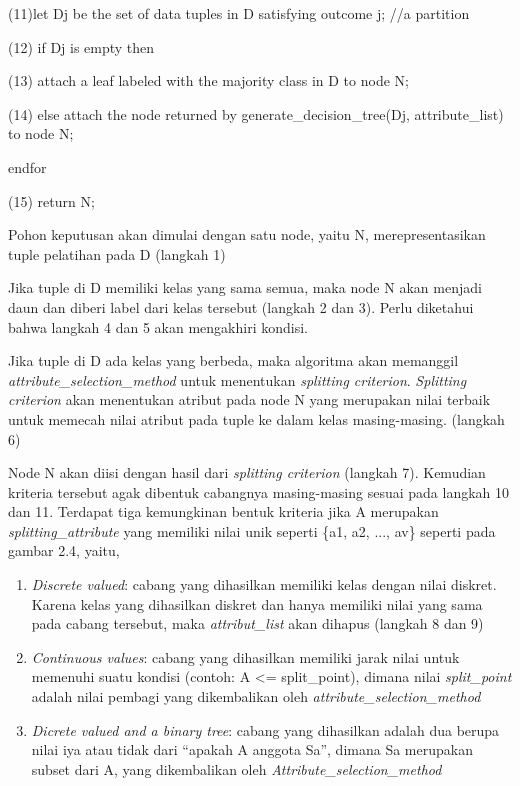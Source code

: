 (11)let D\lowercase{j} be the set of data tuples in D satisfying outcome j; //a partition

(12) if D\lowercase{j} is empty then

(13) attach a leaf labeled with the majority class in D to node N;

(14) else attach the node returned by generate\_decision\_tree(D\lowercase{j}, attribute\_list) to node N;

endfor

(15) return N;


Pohon keputusan akan dimulai dengan satu node, yaitu N, merepresentasikan tuple pelatihan pada D (langkah 1)

Jika tuple di D memiliki kelas yang sama semua, maka node N akan menjadi daun dan diberi label dari kelas tersebut (langkah 2 dan 3). Perlu diketahui bahwa langkah 4 dan 5 akan mengakhiri kondisi.

Jika tuple di D ada kelas yang berbeda, maka algoritma akan memanggil \textsl{attribute\_selection\_method} untuk menentukan \textsl{splitting criterion}. \textsl{Splitting criterion} akan menentukan atribut pada node N yang merupakan nilai terbaik untuk memecah nilai atribut pada tuple ke dalam kelas masing-masing. (langkah 6)

Node N akan diisi dengan hasil dari \textsl{splitting criterion} (langkah 7). Kemudian kriteria tersebut agak dibentuk cabangnya masing-masing sesuai pada langkah 10 dan 11. Terdapat tiga kemungkinan bentuk kriteria jika A merupakan \textsl{splitting\_attribute} yang memiliki nilai unik seperti \{a1, a2, ..., av\} seperti pada gambar 2.4, yaitu,

\begin{enumerate}
	\item \textsl{Discrete valued}: cabang yang dihasilkan memiliki kelas dengan nilai diskret. Karena kelas yang dihasilkan diskret dan hanya memiliki nilai yang sama pada cabang tersebut, maka \textsl{attribut\_list} akan dihapus (langkah 8 dan 9)
	\item \textsl{Continuous values}: cabang yang dihasilkan memiliki jarak nilai untuk memenuhi suatu kondisi (contoh: A <= split\_point), dimana nilai \textsl{split\_point} adalah nilai pembagi yang dikembalikan oleh \textsl{attribute\_selection\_method}
	\item \textsl{Dicrete valued and a binary tree}: cabang yang dihasilkan adalah dua berupa nilai iya atau tidak dari "`apakah A anggota Sa"', dimana Sa merupakan subset dari A, yang dikembalikan oleh \textsl{Attribute\_selection\_method}
\end{enumerate}


